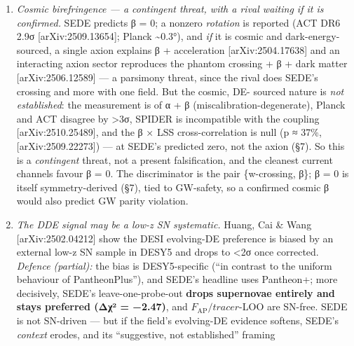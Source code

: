 \documentclass[
  10pt,
]{article}
\begin{document}
\begin{enumerate}
  wall is simply absent for SEDE. \emph{Residual scope:} only the ACT
  DR6 \emph{primary} multifrequency likelihood remains not run (ACT
  \emph{lensing}, the DE-sensitive channel, is; §above) ---
  \textbf{formally deferred} under the pre-registered trigger
  (PREREGISTRATION.md §E; \texttt{act\_dr6\_mflike} + multi-GB products
  not installed), with the falsifiable committed expectation
  \textbar Δχ²\textbar{} \textless{} 1 given three concordant CMB
  datasets already at that level; a full MCMC for ΔDIC is deferred
  (expected ≈ Δχ², \(p_{\mathrm{D}}\) shared). The full primary
  likelihood is also folded \emph{into the joint} (§5.1).
\item
  \emph{Cosmic birefringence --- a contingent threat, with a rival
  waiting if it is confirmed.} SEDE predicts β = 0; a nonzero
  \emph{rotation} is reported (ACT DR6 2.9σ {[}arXiv:2509.13654{]};
  Planck \textasciitilde0.3°), and \emph{if} it is cosmic and
  dark-energy-sourced, a single axion explains β + acceleration
  {[}arXiv:2504.17638{]} and an interacting axion sector reproduces the
  phantom crossing + β + dark matter {[}arXiv:2506.12589{]} --- a
  parsimony threat, since the rival does SEDE's crossing and more with
  one field. But the cosmic, DE- sourced nature is \emph{not
  established}: the measurement is of α + β (miscalibration-degenerate),
  Planck and ACT disagree by \textgreater3σ, SPIDER is incompatible with
  the coupling {[}arXiv:2510.25489{]}, and the β × LSS cross-correlation
  is null (p ≈ 37\%, {[}arXiv:2509.22273{]}) --- at SEDE's predicted
  zero, not the axion (§7). So this is a \emph{contingent} threat, not a
  present falsification, and the cleanest current channels favour β = 0.
  The discriminator is the pair \{w-crossing, β\}; β = 0 is itself
  symmetry-derived (§7), tied to GW-safety, so a confirmed cosmic β
  would also predict GW parity violation.
\item
  \emph{The DDE signal may be a low-z SN systematic.} Huang, Cai \& Wang
  {[}arXiv:2502.04212{]} show the DESI evolving-DE preference is biased
  by an external low-z SN sample in DESY5 and drops to \textless2σ once
  corrected. \emph{Defence (partial):} the bias is DESY5-specific (``in
  contrast to the uniform behaviour of PantheonPlus''), and SEDE's
  headline uses Pantheon+; more decisively, SEDE's leave-one-probe-out
  \textbf{drops supernovae entirely and stays preferred (Δχ² = −2.47)},
  and \(F_{\mathrm{AP}} / tracer\)-LOO are SN-free. SEDE is not
  SN-driven --- but if the field's evolving-DE evidence softens, SEDE's
  \emph{context} erodes, and its ``suggestive, not established'' framing

\end{enumerate}
\end{document}
